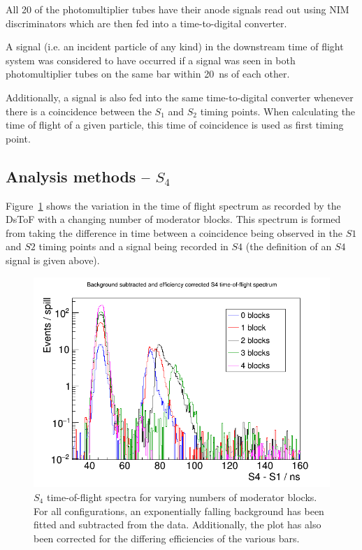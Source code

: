     All 20 of the photomultiplier tubes have their anode signals read out using NIM discriminators which are then fed into a time-to-digital converter. 
    
    A signal (i.e. an incident particle of any kind) in the downstream time of flight system was considered to have occurred if a signal was seen in both photomultiplier tubes on the same bar within 20~ns of each other.
    
    Additionally, a signal is also fed into the same time-to-digital converter whenever there is a coincidence between the $S_1$ and $S_2$ timing points. When calculating the time of flight of a given particle, this time of coincidence is used as first timing point.
    
	\subsection{Analysis methods -- $S_{4}$}

	Figure~\ref{fig:s4tof} shows the variation in the time of flight spectrum as recorded by the DsToF with a changing number of moderator blocks. This spectrum is formed from taking the difference in time between a coincidence being observed in the $S1$ and $S2$ timing points and a signal being recorded in $S4$ (the definition of an $S4$ signal is given above).
	
	\begin{figure}[h]
		\centering
		\includegraphics[width=0.7\linewidth]{files/Figures/s4ToF_axisAdj.png}
		\caption{$S_{4}$ time-of-flight spectra for varying numbers of moderator blocks. For all configurations, an exponentially falling background has been fitted and subtracted from the data. Additionally, the plot has also been corrected for the differing efficiencies of the various bars.}
		\label{fig:s4tof}	
	\end{figure}


